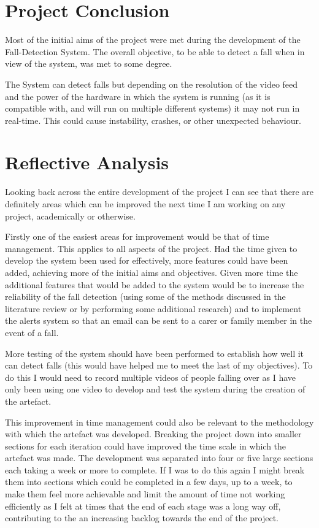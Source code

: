 \documentclass[11pt,a4paper]{report}
\begin{document}
\chapter{Project Conclusion}

Most of the initial aims of the project were met during the development of the Fall-Detection System. The overall objective, to be able to detect a fall when in view of the system, was met to some degree.

The System can detect falls but depending on the resolution of the video feed and the power of the hardware in which the system is running (as it is compatible with, and will run on multiple different systems) it may not run in real-time. This could cause instability, crashes, or other unexpected behaviour.

\chapter{Reflective Analysis}
Looking back across the entire development of the project I can see that there are definitely areas which can be improved the next time I am working on any project, academically or otherwise.

Firstly one of the easiest areas for improvement would be that of time management. This applies to all aspects of the project. Had the time given to develop the system been used for effectively, more features could have been added, achieving more of the initial aims and objectives. Given more time the additional features that would be added to the system would be to increase the reliability of the fall detection (using some of the methods discussed in the literature review or by performing some additional research) and to implement the alerts system so that an email can be sent to a carer or family member in the event of a fall. 

More testing of the system should have been performed to establish how well it can detect falls (this would have helped me to meet the last of my objectives). To do this I would need to record multiple videos of people falling over as I have only been using one video to develop and test the system during the creation of the artefact.

This improvement in time management could also be relevant to the methodology with which the artefact was developed. Breaking the project down into smaller sections for each iteration could have improved the time scale in which the artefact was made. The development was separated into four or five large sections each taking a week or more to complete. If I was to do this again I might break them into sections which could be completed in a few days, up to a week, to make them feel more achievable and limit the amount of time not working efficiently as I felt at times that the end of each stage was a long way off, contributing to the an increasing backlog towards the end of the project.
\end{document}
